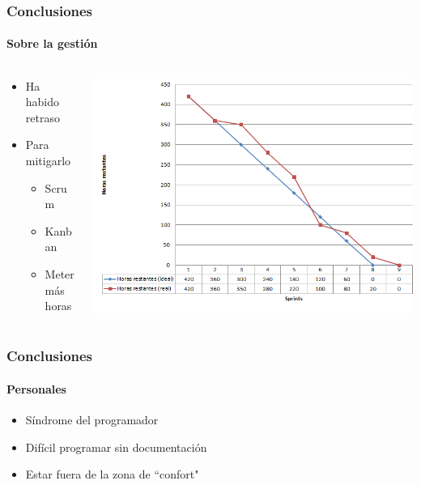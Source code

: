 \begin{frame}
	\frametitle{Conclusiones}
	\framesubtitle{Sobre la gesti\'on}
	
	\begin{columns}[T] %
		
		\begin{column}[T]{0.35\linewidth} %
			\begin{itemize}
				\item Ha habido retraso
				\item Para mitigarlo
				\begin{itemize}
					\item Scrum
					\item Kanban
					\item Meter m\'as horas
				\end{itemize}
			\end{itemize}
		\end{column}
		
		\begin{column}[T]{0.65\linewidth} %
			\includegraphics[width=1.0\linewidth]{./Figures/burndown.png}
		\end{column}
	\end{columns}
\end{frame}

\begin{frame}
	\frametitle{Conclusiones}
	\framesubtitle{Personales}
	
	\begin{itemize}
		\item S\'indrome del programador
		\item Dif\'icil programar sin documentaci\'on
		\item Estar fuera de la zona de ``confort"
	\end{itemize}
\end{frame}

